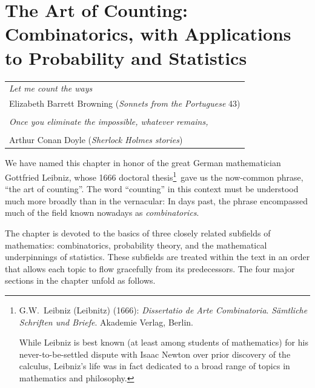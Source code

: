 
\chapter{The Art of Counting:
Combinatorics, with Applications to Probability and Statistics}
\label{ch:prob-stat}
\label{ch:combinatorics}


\hfill
\begin{tabular}{l}
{\em Let me count the ways} \\
\hfill {\small Elizabeth Barrett Browning ({\it Sonnets from the Portuguese} 43)} \\
 \\
{\em Once you eliminate the impossible, whatever remains,} \\
\hspace*{.35in}{\em no matter how improbable, must be the truth.} \\ 
\hfill {\small Arthur Conan Doyle ({\it Sherlock Holmes stories})}
\end{tabular}


\vspace*{.5in}

 

\noindent
We have named this chapter in honor of the great German mathematician Gottfried Leibniz, whose 1666 doctoral thesis\footnote{G.W.~Leibniz (Leibnitz) (1666):  {\it Dissertatio de Arte Combinatoria}.  {\it S\"{a}mtliche Schriften und Briefe}.  Akademie Verlag, Berlin.

While Leibniz is best known (at least among students of mathematics) for his never-to-be-settled dispute with Isaac Newton over prior discovery of the calculus, Leibniz's life was in fact dedicated to a broad range of topics in mathematics and philosophy.}~gave us the now-common phrase, ``the art of counting''.  The word ``counting'' in this context must be understood much more broadly than in the vernacular: In days past, the phrase encompassed much of the field known nowadays as {\it combinatorics}. 

\medskip

The chapter is devoted to the basics of three closely related subfields of mathematics: combinatorics, probability theory, and the mathematical underpinnings of statistics.  These subfields are treated within the text in an order that allows each topic to flow gracefully from its predecessors.  The four major sections in the chapter unfold as follows.

